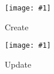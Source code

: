 \documentclass{article}
\newcommand{\diagram}[2]{
	\texttt{[image: \#1]}
	\caption{#2}
}
\newcommand{\vertdiagram}[2]{
	\begin{sidewaysfigure}
		\diagram{#1}{#2}
	\end{sidewaysfigure}
}
\begin{document}
	\vertdiagram{ControllerInteractionCreate}{Create}
	\vertdiagram{ControllerInteractionUpdate}{Update}
\end{document}
